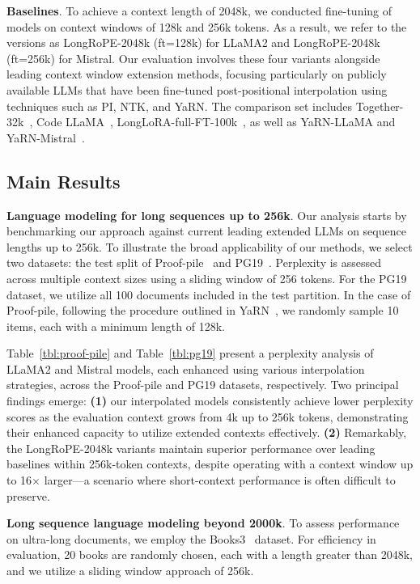 \textbf{Baselines}. To achieve a context length of 2048k, we conducted fine-tuning of models on context windows of 128k and 256k tokens. As a result, we refer to the versions as LongRoPE-2048k (ft=128k) for LLaMA2 and LongRoPE-2048k (ft=256k) for Mistral. Our evaluation involves these four variants alongside leading context window extension methods, focusing particularly on publicly available LLMs that have been fine-tuned post-positional interpolation using techniques such as PI, NTK, and YaRN. The comparison set includes Together-32k~\cite{together}, Code LLaMA~\cite{codellama}, LongLoRA-full-FT-100k~\cite{longlora}, as well as YaRN-LLaMA and YaRN-Mistral~\cite{yarn}.

\subsection{Main Results}

\label{sec:mainresult}
\textbf{Language modeling for long sequences up to 256k}. Our analysis starts by benchmarking our approach against current leading extended LLMs on sequence lengths up to 256k. To illustrate the broad applicability of our methods, we select two datasets: the test split of Proof-pile~\cite{pg19} and PG19~\cite{pile}. Perplexity is assessed across multiple context sizes using a sliding window of 256 tokens. For the PG19 dataset, we utilize all 100 documents included in the test partition. In the case of Proof-pile, following the procedure outlined in YaRN~\cite{yarn}, we randomly sample 10 items, each with a minimum length of 128k.

Table~\ref{tbl:proof-pile} and Table~\ref{tbl:pg19} present a perplexity analysis of LLaMA2 and Mistral models, each enhanced using various interpolation strategies, across the Proof-pile and PG19 datasets, respectively. Two principal findings emerge: \textbf{(1)} our interpolated models consistently achieve lower perplexity scores as the evaluation context grows from 4k up to 256k tokens, demonstrating their enhanced capacity to utilize extended contexts effectively. \textbf{(2)} Remarkably, the LongRoPE-2048k variants maintain superior performance over leading baselines within 256k-token contexts, despite operating with a context window up to 16$\times$ larger—a scenario where short-context performance is often difficult to preserve.

\textbf{Long sequence language modeling beyond 2000k}. To assess performance on ultra-long documents, we employ the Books3~\cite{pile} dataset. For efficiency in evaluation, 20 books are randomly chosen, each with a length greater than 2048k, and we utilize a sliding window approach of 256k.

